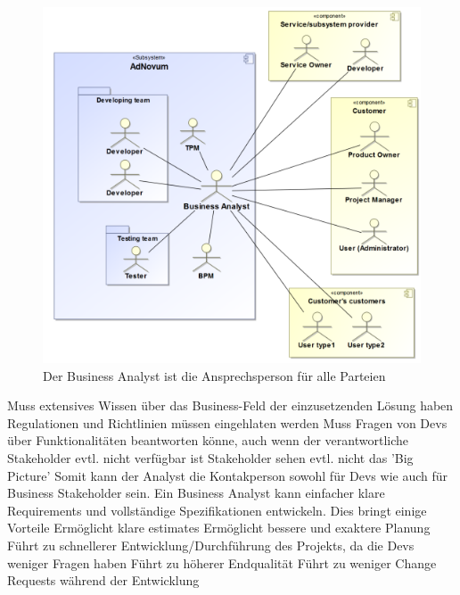 \documentclass[a4paper, 11pt]{article}
\begin{document}
\begin{figure}
    \centering
    \includegraphics[keepaspectratio=true,height=15\baselineskip]{ba.png}
    \caption{Der Business Analyst ist die Ansprechsperson für alle Parteien}
    \label{fig:datawarehouse}
\end{figure}

\begin{outline}
    \1 Muss extensives Wissen über das Business-Feld der einzusetzenden Lösung haben
        \2 Regulationen und Richtlinien müssen eingehlaten werden
        \2 Muss Fragen von Devs über Funktionalitäten beantworten könne, auch wenn der verantwortliche Stakeholder evtl. nicht verfügbar ist
        \2 Stakeholder sehen evtl. nicht das 'Big Picture'
        \2 Somit kann der Analyst die Kontakperson sowohl für Devs wie auch für Business Stakeholder sein.
    \1 Ein Business Analyst kann einfacher klare Requirements und vollständige Spezifikationen entwickeln. Dies bringt einige Vorteile
        \2 Ermöglicht klare estimates
        \2 Ermöglicht bessere und exaktere Planung
        \2 Führt zu schnellerer Entwicklung/Durchführung des Projekts, da die Devs weniger Fragen haben
        \2 Führt zu höherer Endqualität
        \2 Führt zu weniger Change Requests während der Entwicklung
\end{outline}

\vspace{5px}
\end{document}
